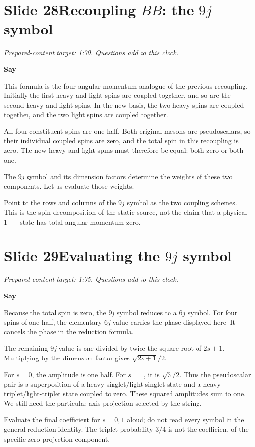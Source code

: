 \documentclass[11pt,a4paper]{article}
\newcommand{\cue}[1]{\begin{private}#1\end{private}}
\newenvironment{speech}{\par\textbf{Say}\par}{\par}
\newcommand{\slidenote}[3]{%
  \clearpage
  \pdfbookmark[1]{Slide #1}{slide-#1}%
  \section*{Slide #1\quad #2}
  \textit{Prepared-content target: #3. Questions add to this clock.}\par
}
\begin{document}
\slidenote{28}{Recoupling $B\bar B$: the $9j$ symbol}{1:00}
\begin{speech}
This formula is the four-angular-momentum analogue of the previous
recoupling. Initially the first heavy and light spins are coupled
together, and so are the second heavy and light spins. In the new
basis, the two heavy spins are coupled together, and the two light
spins are coupled together.

All four constituent spins are one half. Both original mesons are
pseudoscalars, so their individual coupled spins are zero, and
the total spin in this recoupling is zero. The new heavy and light
spins must therefore be equal: both zero or both one.

The $9j$ symbol and its dimension factors determine the weights
of these two components. Let us evaluate those weights.
\end{speech}
\cue{Point to the rows and columns of the $9j$ symbol as the two coupling
schemes. This is the spin decomposition of the static source, not the
claim that a physical $1^{++}$ state has total angular momentum zero.}

\slidenote{29}{Evaluating the $9j$ symbol}{1:05}
\begin{speech}
Because the total spin is zero, the $9j$ symbol reduces to a $6j$
symbol. For four spins of one half, the elementary $6j$ value
carries the phase displayed here. It cancels the phase in the
reduction formula.

The remaining $9j$ value is one divided by twice the square root
of $2s+1$. Multiplying by the dimension factor gives
$\sqrt{2s+1}/2$.

For $s=0$, the amplitude is one half. For $s=1$, it is
$\sqrt3/2$. Thus the pseudoscalar pair is a superposition of a
heavy-singlet/light-singlet state and a heavy-triplet/light-triplet
state coupled to zero. These squared amplitudes sum to one.
We still need the particular axis projection selected by the string.
\end{speech}
\cue{Evaluate the final coefficient for $s=0,1$ aloud; do not read every
symbol in the general reduction identity. The triplet probability $3/4$
is not the coefficient of the specific zero-projection component.}
\end{document}
